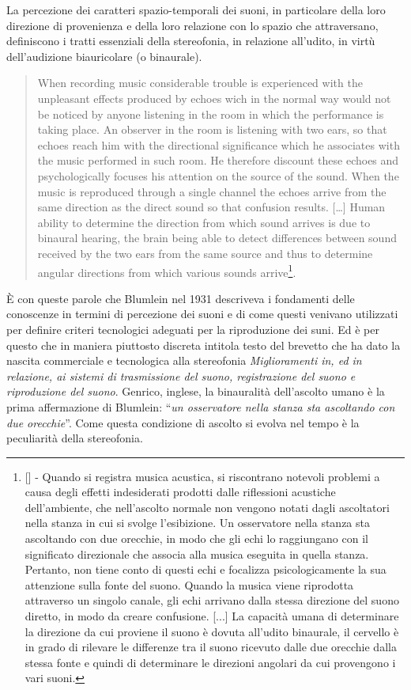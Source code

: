 La percezione dei caratteri spazio-temporali dei suoni, in particolare della
loro direzione di provenienza e della loro relazione con lo spazio che
attraversano, definiscono i tratti essenziali della stereofonia, in relazione
all'udito, in virtù dell’audizione biauricolare (o binaurale).

\begin{quote}
When recording music considerable trouble is experienced with the unpleasant
effects produced by echoes wich in the normal way would not be noticed by anyone
listening in the room in which the performance is taking place.
An observer in the room is listening with two ears, so that echoes reach him
with the directional significance which he associates with the music performed
in such room. He therefore discount these echoes and psychologically focuses
his attention on the source of the sound. When the music is reproduced through
a single channel the echoes arrive from the same direction as the direct sound
so that confusion results. [\ldots] Human ability to determine the direction
from which sound arrives is due to binaural hearing, the brain being able to
detect differences between sound received by the two ears from the same source
and thus to determine angular directions from which various sounds
arrive\footnote{[\cite{ab58}] - Quando si registra musica acustica, si riscontrano
notevoli problemi a causa degli effetti indesiderati prodotti dalle riflessioni
acustiche dell'ambiente, che nell'ascolto normale non vengono notati dagli
ascoltatori nella stanza in cui si svolge l'esibizione.
Un osservatore nella stanza sta ascoltando con due orecchie, in
modo che gli echi lo raggiungano con il significato direzionale che associa alla
musica eseguita in quella stanza. Pertanto, non tiene conto di questi echi e
focalizza psicologicamente la sua attenzione sulla fonte del suono. Quando la
musica viene riprodotta attraverso un singolo canale, gli echi arrivano dalla
stessa direzione del suono diretto, in modo da creare confusione. [...] La
capacità umana di determinare la direzione da cui proviene il suono è dovuta
all'udito binaurale, il cervello è in grado di rilevare le differenze tra il
suono ricevuto dalle due orecchie dalla stessa fonte e quindi di determinare le
direzioni angolari da cui provengono i vari suoni.}.
\end{quote}

È con queste parole che Blumlein nel 1931 descriveva i fondamenti delle conoscenze
in termini di percezione dei suoni e di come questi venivano utilizzati per definire
criteri tecnologici adeguati per la riproduzione dei suni. Ed è per questo che
in maniera piuttosto discreta intitola testo del brevetto che ha dato la nascita
commerciale e tecnologica alla stereofonia \emph{Miglioramenti in, ed in relazione,
ai sistemi di trasmissione del suono, registrazione del suono e riproduzione del suono}.
Genrico, inglese, la binauralità dell'ascolto umano è la prima affermazione di
Blumlein: “\emph{un osservatore nella stanza sta ascoltando con due orecchie}”.
Come questa condizione di ascolto si evolva nel tempo è la peculiarità della
stereofonia.


